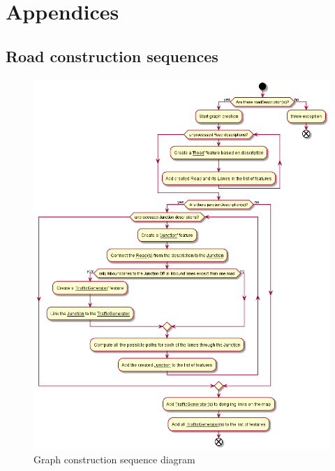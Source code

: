\appendix
\section*{Appendices}
\renewcommand{\thesubsection}{\Alph{subsection}}


\fontsize{9}{11}\selectfont

\normalsize

\subsection{Road construction sequences}
\label{sec:roadConstructionSequences}
\begin{figure}[h!]
  	\caption{Graph construction sequence diagram}
  	\label{fig:graphConstructSeqDiag}
  	\centering
  	\includegraphics[width=\textwidth]{figs/graphConstruction/GraphConstruction.png}
\end{figure}

